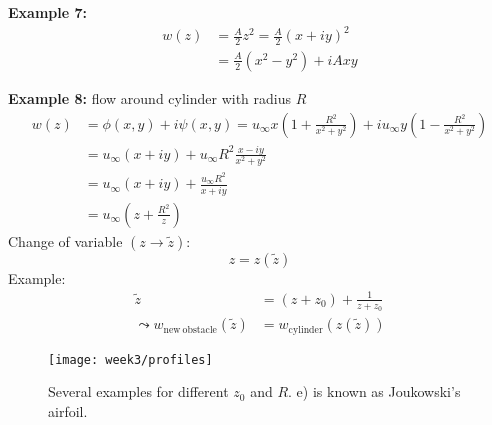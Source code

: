 \textbf{Example 7:}
\begin{align}
w(z) &= \frac{A}{2}z^2 = \frac{A}{2}(x+iy)^2\\
&= \frac{A}{2}(x^2-y^2)+iAxy
\end{align}

\textbf{Example 8:} flow around cylinder with radius $R$
\begin{align}
w(z) &= \phi(x,y) +i\psi(x,y) = u_\infty x\left(1+\frac{R^2}{x^2+y^2}\right) + iu_\infty y \left(1-\frac{R^2}{x^2+y^2}\right) \\
& =u_\infty(x+iy) + u_\infty R^2\frac{x-iy}{x^2+y^2} \\
&= u_\infty(x+iy)+\frac{u_\infty R^2}{x+iy}\\
&= u_\infty\left(z+\frac{R^2}{z}\right)
\end{align}
Change of variable $(z\rightarrow\tilde{z})$:
\begin{equation}
z=z(\tilde{z})
\end{equation}
Example:
\begin{align}
\tilde{z} &= (z+z_0)+\frac{1}{z+z_0}\\
\leadsto
w_\mathrm{new\ obstacle}(\tilde{z}) &= w_\mathrm{cylinder}(z(\tilde{z}))
\end{align}

\begin{figure}[!h]
    \centering
    \texttt{[image: week3/profiles]}\\
    \caption{Several examples for different $z_0$ and $R$. e) is known as Joukowski's airfoil.}
    \label{fig:profiles}
\end{figure}
